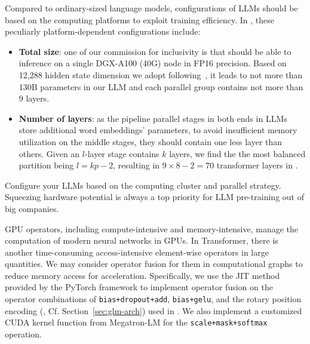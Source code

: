 {{
Compared to ordinary-sized language models, configurations of LLMs should be based on the computing platforms to exploit training efficiency.
In \glm, these peculiarly platform-dependent configurations include:
\begin{itemize}[leftmargin=*,itemsep=0pt,parsep=0.2em,topsep=0.0em,partopsep=0.0em]
    \item \textbf{Total size}: one of our commission for inclusivity is that \glm should be able to inference on a single DGX-A100 (40G) node in FP16 precision. Based on 12,288 hidden state dimension we adopt following~\citep{brown2020language}, it leads to not more than 130B parameters in our LLM and each parallel group contains not more than 9 layers. 
    \item \textbf{Number of layers}: as the pipeline parallel stages in both ends in LLMs store additional word embeddings' parameters, to avoid insufficient memory utilization on the middle stages, they should contain one less layer than others. Given an $l$-layer \glm stage contains $k$ layers, we find the the most balanced partition being $l=kp - 2$, resulting in $9\times8 - 2=70$ transformer layers in \glm.
\end{itemize}


\begin{insight}
\rm Configure your LLMs based on the computing cluster and parallel strategy. Squeezing hardware potential is always a top priority for LLM pre-training out of big companies.
\end{insight}

GPU operators, including compute-intensive and memory-intensive, manage the computation of modern neural networks in GPUs. 
In Transformer, there is another time-consuming access-intensive element-wise operators in large quantities. 
We may consider operator fusion for them in computational graphs to reduce memory access for acceleration. 
Specifically, we use the JIT method provided by the PyTorch framework to implement operator fusion on the operator combinations of \texttt{bias+dropout+add}, \texttt{bias+gelu}, and the rotary position encoding (\cite{su2021roformer}, Cf. Section~\ref{sec:glm-arch}) used in \glm. 
We also implement a customized CUDA kernel function from Megatron-LM for the \texttt{scale+mask+softmax} operation. 

}}
